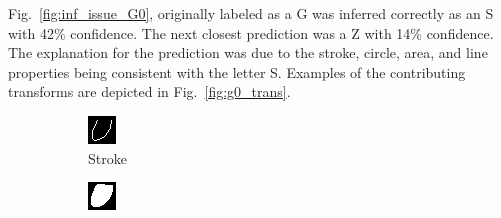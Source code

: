 \documentclass[conference]{IEEEtran}
\begin{document}
Fig.~\ref{fig:inf_issue_G0}, originally labeled as a G was inferred correctly as
an S with 42\% confidence.  The next closest prediction was a Z with 14\%
confidence.  The explanation for the prediction was due to the stroke, circle,
area, and line properties being consistent with the letter S. Examples of the
contributing transforms are depicted in Fig.~\ref{fig:g0_trans}.

\begin{figure}[h]
    \centering
    \begin{subfigure}{.20\columnwidth}
        \centering
        \includegraphics[width=.90\textwidth]{./images/issues/excluded-T-5-stroke.png}
        \caption{Stroke}
    \end{subfigure}%
    \begin{subfigure}{.20\columnwidth}
        \centering
        \includegraphics[width=.90\textwidth]{./images/issues/excluded-T-5-area.png}

\end{subfigure}
\end{figure}
\end{document}
